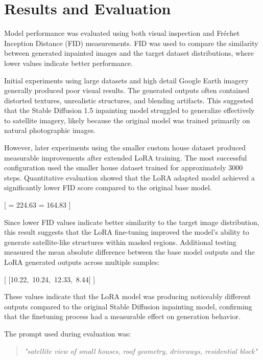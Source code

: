 \documentclass{article}
\begin{document}
\newpage
\section{Results and Evaluation}
Model performance was evaluated using both visual inspection and Fréchet Inception Distance (FID) measurements. FID was used to compare the similarity between generated inpainted images and the target dataset distributions, where lower values indicate better performance.
\newline

Initial experiments using large datasets and high detail Google Earth imagery generally produced poor visual results. The generated outputs often contained distorted textures, unrealistic structures, and blending artifacts. This suggested that the Stable Diffusion 1.5 inpainting model struggled to generalize effectively to satellite imagery, likely because the original model was trained primarily on natural photographic images.

However, later experiments using the smaller custom house dataset produced measurable improvements after extended LoRA training. The most successful configuration used the smaller house dataset trained for approximately 3000 steps. Quantitative evaluation showed that the LoRA adapted model achieved a significantly lower FID score compared to the original base model.
\newline

[
     = 224.63
    \qquad
     = 164.83
]
\newline

Since lower FID values indicate better similarity to the target image distribution, this result suggests that the LoRA fine-tuning improved the model's ability to generate satellite-like structures within masked regions.
Additional testing measured the mean absolute difference between the base model outputs and the LoRA generated outputs across multiple samples:

[
    [10.22,\ 10.24,\ 12.33,\ 8.44]
]
\newline

These values indicate that the LoRA model was producing noticeably different outputs compared to the original Stable Diffusion inpainting model, confirming that the finetuning process had a measurable effect on generation behavior.

The prompt used during evaluation was:

\begin{quote}
    \textit{"satellite view of small houses, roof geometry, driveways, residential block"}
\end{quote}
\end{document}
